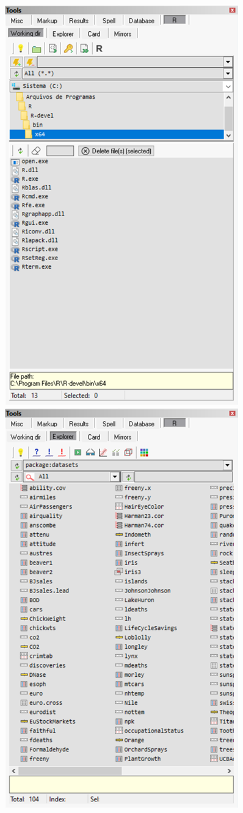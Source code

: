 \begin{figure}[H]
  \includegraphics[scale=0.6]{./res/tools_r_workingdir.png}~~
  \includegraphics[scale=0.6]{./res/tools_r_explorer.png}\\

\end{figure}
